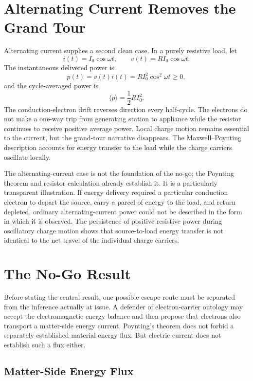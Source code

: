 \documentclass[12pt,onecolumn]{article}
\begin{document}
\section{Alternating Current Removes the Grand Tour}

Alternating current supplies a second clean case. In a purely resistive load, let
\[
i(t)=I_0\cos\omega t,
\qquad
v(t)=RI_0\cos\omega t.
\]
The instantaneous delivered power is
\[
p(t)=v(t)i(t)=RI_0^2\cos^2\omega t\geq 0,
\]
and the cycle-averaged power is
\[
\langle p\rangle=\frac{1}{2}RI_0^2.
\]
The conduction-electron drift reverses direction every half-cycle. The electrons do not make a one-way trip from generating station to appliance while the resistor continues to receive positive average power. Local charge motion remains essential to the current, but the grand-tour narrative disappears. The Maxwell--Poynting description accounts for energy transfer to the load while the charge carriers oscillate locally.

The alternating-current case is not the foundation of the no-go; the Poynting theorem and resistor calculation already establish it. It is a particularly transparent illustration. If energy delivery required a particular conduction electron to depart the source, carry a parcel of energy to the load, and return depleted, ordinary alternating-current power could not be described in the form in which it is observed. The persistence of positive resistive power during oscillatory charge motion shows that source-to-load energy transfer is not identical to the net travel of the individual charge carriers.


\section{The No-Go Result}

Before stating the central result, one possible escape route must be separated from the inference actually at issue. A defender of electron-carrier ontology may accept the electromagnetic energy balance and then propose that electrons also transport a matter-side energy current. Poynting's theorem does not forbid a separately established material energy flux. But electric current does not establish such a flux either.

\subsection{Matter-Side Energy Flux}
\end{document}
